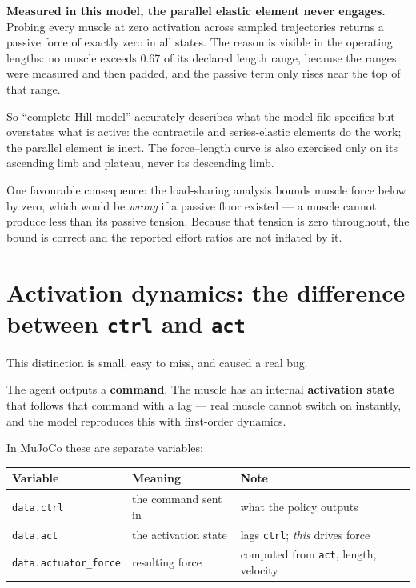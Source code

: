 \begin{trap}
\textbf{Measured in this model, the parallel elastic element never engages.}
Probing every muscle at zero activation across sampled trajectories returns a
passive force of exactly zero in all states. The reason is visible in the
operating lengths: no muscle exceeds 0.67 of its declared length range, because
the ranges were measured and then padded, and the passive term only rises near
the top of that range.

So ``complete Hill model'' accurately describes what the model file specifies but
overstates what is active: the contractile and series-elastic elements do the
work; the parallel element is inert. The force--length curve is also exercised
only on its ascending limb and plateau, never its descending limb.

One favourable consequence: the load-sharing analysis bounds muscle force below
by zero, which would be \emph{wrong} if a passive floor existed --- a muscle
cannot produce less than its passive tension. Because that tension is zero
throughout, the bound is correct and the reported effort ratios are not inflated
by it.
\end{trap}

\section{Activation dynamics: the difference between \texttt{ctrl} and \texttt{act}}

This distinction is small, easy to miss, and caused a real bug.

The agent outputs a \textbf{command}. The muscle has an internal
\textbf{activation state} that follows that command with a lag --- real muscle
cannot switch on instantly, and the model reproduces this with first-order
dynamics.

In MuJoCo these are separate variables:

\begin{center}
\begin{tabular}{@{} L{3.6cm} L{3.6cm} L{7.2cm} @{}}
\toprule
\textbf{Variable} & \textbf{Meaning} & \textbf{Note} \\
\midrule
\texttt{data.ctrl} & the command sent in & what the policy outputs \\
\texttt{data.act}  & the activation state & lags \texttt{ctrl}; \emph{this} drives force \\
\texttt{data.actuator\_force} & resulting force & computed from \texttt{act}, length, velocity \\
\bottomrule
\end{tabular}
\end{center}

